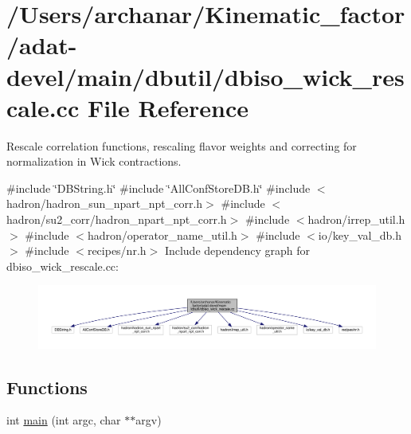 \hypertarget{adat-devel_2main_2dbutil_2dbiso__wick__rescale_8cc}{}\section{/\+Users/archanar/\+Kinematic\+\_\+factor/adat-\/devel/main/dbutil/dbiso\+\_\+wick\+\_\+rescale.cc File Reference}
\label{adat-devel_2main_2dbutil_2dbiso__wick__rescale_8cc}


Rescale correlation functions, rescaling flavor weights and correcting for normalization in Wick contractions.  


{\ttfamily \#include \char`\"{}D\+B\+String.\+h\char`\"{}}\newline
{\ttfamily \#include \char`\"{}All\+Conf\+Store\+D\+B.\+h\char`\"{}}\newline
{\ttfamily \#include $<$hadron/hadron\+\_\+sun\+\_\+npart\+\_\+npt\+\_\+corr.\+h$>$}\newline
{\ttfamily \#include $<$hadron/su2\+\_\+corr/hadron\+\_\+npart\+\_\+npt\+\_\+corr.\+h$>$}\newline
{\ttfamily \#include $<$hadron/irrep\+\_\+util.\+h$>$}\newline
{\ttfamily \#include $<$hadron/operator\+\_\+name\+\_\+util.\+h$>$}\newline
{\ttfamily \#include $<$io/key\+\_\+val\+\_\+db.\+h$>$}\newline
{\ttfamily \#include $<$recipes/nr.\+h$>$}\newline
Include dependency graph for dbiso\+\_\+wick\+\_\+rescale.\+cc\+:
\nopagebreak
\begin{figure}[H]
\begin{center}
\leavevmode
\includegraphics[width=350pt]{d7/dbf/adat-devel_2main_2dbutil_2dbiso__wick__rescale_8cc__incl}
\end{center}
\end{figure}
\subsection*{Functions}
\begin{DoxyCompactItemize}
\item 
int \mbox{\hyperlink{adat-devel_2main_2dbutil_2dbiso__wick__rescale_8cc_a3c04138a5bfe5d72780bb7e82a18e627}{main}} (int argc, char $\ast$$\ast$argv)
\end{DoxyCompactItemize}


